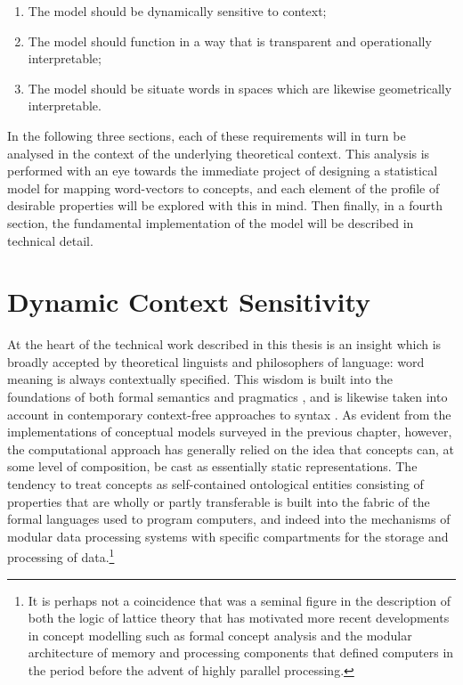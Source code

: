 \begin{enumerate}
\item The model should be dynamically sensitive to context;
\item The model should function in a way that is transparent and operationally interpretable;
\item The model should be situate words in spaces which are likewise geometrically interpretable.
\end{enumerate}

In the following three sections, each of these requirements will in turn be analysed in the context of the underlying theoretical context.  This analysis is performed with an eye towards the immediate project of designing a statistical model for mapping word-vectors to concepts, and each element of the profile of desirable properties will be explored with this in mind.  Then finally, in a fourth section, the fundamental implementation of the model will be described in technical detail.

\section{Dynamic Context Sensitivity}
At the heart of the technical work described in this thesis is an insight which is broadly accepted by theoretical linguists and philosophers of language: word meaning is always contextually specified.  This wisdom is built into the foundations of both formal semantics \citep{Montague1974} and pragmatics \citep{Grice1975}, and is likewise taken into account in contemporary context-free approaches to syntax \cite{Chomsky1986}.  As evident from the implementations of conceptual models surveyed in the previous chapter, however, the computational approach has generally relied on the idea that concepts can, at some level of composition, be cast as essentially static representations.  The tendency to treat concepts as self-contained ontological entities consisting of properties that are wholly or partly transferable is built into the fabric of the formal languages used to program computers, and indeed into the mechanisms of modular data processing systems with specific compartments for the storage and processing of data.\footnote{It is perhaps not a coincidence that \cite{VonNeumann} was a seminal figure in the description of both the logic of lattice theory that has motivated more recent developments in concept modelling such as formal concept analysis \citep{Wille} and the modular architecture of memory and processing components that defined computers in the period before the advent of highly parallel processing.}

